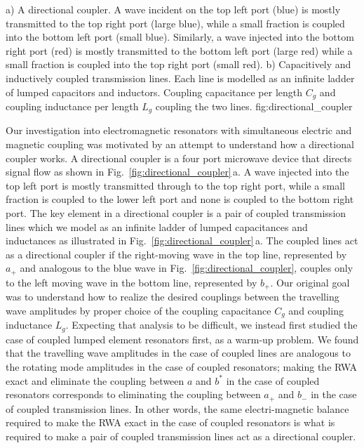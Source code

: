 
{a) A directional coupler.
A wave incident on the top left port (blue) is mostly transmitted to the top right port  (large blue), while a small fraction is coupled into the bottom left port (small blue).
Similarly, a wave injected into the bottom right port (red) is mostly transmitted to the bottom left port (large red) while a small fraction is coupled into the top right port (small red).
b) Capacitively and inductively coupled transmission lines.
Each line is modelled as an infinite ladder of lumped capacitors and inductors. Coupling capacitance per length $C_g$ and coupling inductance per length $L_g$ coupling the two lines.
}
{fig:directional_coupler}

Our investigation into electromagnetic resonators with simultaneous electric and magnetic coupling was motivated by an attempt to understand how a directional coupler works.
A directional coupler is a four port microwave device that directs signal flow as shown in Fig.~\ref{fig:directional_coupler}\,a.
A wave injected into the top left port is mostly transmitted through to the top right port, while a small fraction is coupled to the lower left port and none is coupled to the bottom right port.
The key element in a directional coupler is a pair of coupled transmission lines which we model as an infinite ladder of lumped capacitances and inductances as illustrated in Fig.~\ref{fig:directional_coupler}\,a.
The coupled lines act as a directional coupler if the right-moving wave in the top line, represented by $a_+$ and analogous to the blue wave in Fig.~\ref{fig:directional_coupler}, couples only to the left moving wave in the bottom line, represented by $b_+$.
Our original goal was to understand how to realize the desired couplings between the travelling wave amplitudes by proper choice of the coupling capacitance $C_g$ and coupling inductance $L_g$.
Expecting that analysis to be difficult, we instead first studied the case of coupled lumped element resonators first, as a warm-up problem.
We found that the travelling wave amplitudes in the case of coupled lines are analogous to the rotating mode amplitudes in the case of coupled resonators; making the RWA exact and eliminate the coupling between $a$ and $b^*$ in the case of coupled resonators corresponds to eliminating the coupling between $a_+$ and $b_-$ in the case of coupled transmission lines.
In other words, the same electri-magnetic balance required to make the RWA exact in the case of coupled resonators is what is required to make a pair of coupled transmission lines act as a directional coupler.

